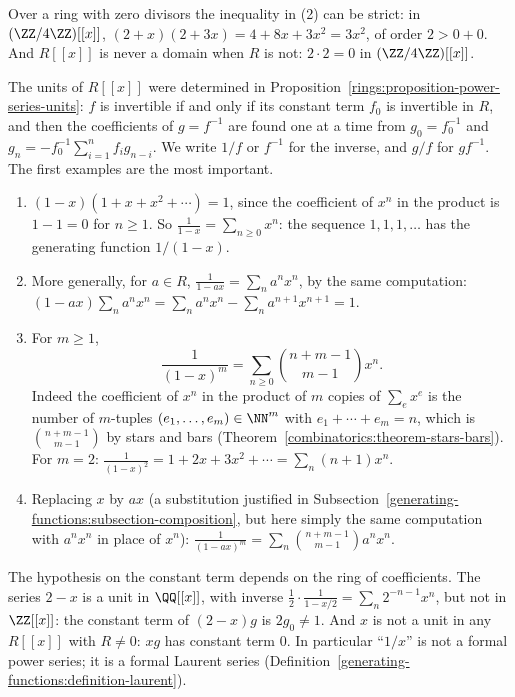 \begin{counterexample}\label{generating-functions:counterexample-order-zero-divisors}
Over a ring with zero divisors the inequality in (2) can be strict: in $(\ZZ/4\ZZ)[[x]]$, $(2 + x)(2 + 3x) = 4 + 8x + 3x^2 = 3x^2$, of order $2 > 0 + 0$. And $R[[x]]$ is never a domain when $R$
is not: $2 \cdot 2 = 0$ in $(\ZZ/4\ZZ)[[x]]$.
\end{counterexample}

The units of $R[[x]]$ were determined in Proposition~\ref{rings:proposition-power-series-units}: $f$ is invertible if and only if its constant term $f_0$ is invertible in $R$, and then the
coefficients of $g = f^{-1}$ are found one at a time from $g_0 = f_0^{-1}$ and $g_n = -f_0^{-1}\sum_{i=1}^{n}f_ig_{n-i}$. We write $1/f$ or $f^{-1}$ for the inverse, and $g/f$ for $gf^{-1}$. The
first examples are the most important.

\begin{example}\label{generating-functions:example-geometric}
\begin{enumerate}
\item $(1 - x)(1 + x + x^2 + \cdots) = 1$, since the coefficient of $x^n$ in the product is $1 - 1 = 0$ for $n \geq 1$. So $\frac{1}{1 - x} = \sum_{n \geq 0}x^n$: the sequence $1, 1, 1, \ldots$
has the generating function $1/(1 - x)$.
\item More generally, for $a \in R$, $\frac{1}{1 - ax} = \sum_na^nx^n$, by the same computation: $(1 - ax)\sum_na^nx^n = \sum_na^nx^n - \sum_na^{n+1}x^{n+1} = 1$.
\item For $m \geq 1$,
\[
\frac{1}{(1 - x)^m} = \sum_{n \geq 0}\binom{n + m - 1}{m - 1}x^n.
\]
Indeed the coefficient of $x^n$ in the product of $m$ copies of $\sum_ex^e$ is the number of $m$-tuples $(e_1, \ldots, e_m) \in \NN^m$ with $e_1 + \cdots + e_m = n$, which is
$\binom{n + m - 1}{m - 1}$ by stars and bars (Theorem~\ref{combinatorics:theorem-stars-bars}). For $m = 2$: $\frac{1}{(1 - x)^2} = 1 + 2x + 3x^2 + \cdots = \sum_n(n + 1)x^n$.
\item Replacing $x$ by $ax$ (a substitution justified in Subsection~\ref{generating-functions:subsection-composition}, but here simply the same computation with $a^nx^n$ in place of $x^n$):
$\frac{1}{(1 - ax)^m} = \sum_n\binom{n + m - 1}{m - 1}a^nx^n$.
\end{enumerate}
\end{example}

\begin{counterexample}\label{generating-functions:counterexample-units}
The hypothesis on the constant term depends on the ring of coefficients. The series $2 - x$ is a unit in $\QQ[[x]]$, with inverse $\frac12 \cdot \frac{1}{1 - x/2} = \sum_n2^{-n-1}x^n$, but not in
$\ZZ[[x]]$: the constant term of $(2 - x)g$ is $2g_0 \neq 1$. And $x$ is not a unit in any $R[[x]]$ with $R \neq 0$: $xg$ has constant term $0$. In particular ``$1/x$'' is not a formal power series;
it is a formal Laurent series (Definition~\ref{generating-functions:definition-laurent}).
\end{counterexample}

